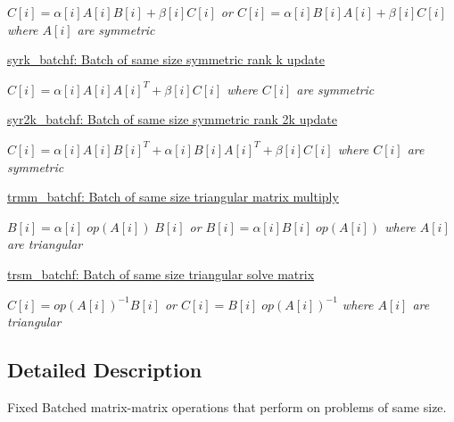 \begin{DoxyCompactItemize}
\begin{DoxyCompactList}\small\item\em $ C[i] = \alpha[i] A[i] B[i] + \beta[i] C[i] $ or $ C[i] = \alpha[i] B[i] A[i] + \beta[i] C[i] $ where $ A[i] $ are symmetric \end{DoxyCompactList}\item 
\hyperlink{group__syrk__batchf}{syrk\+\_\+batchf\+: Batch of same size symmetric rank k update}
\begin{DoxyCompactList}\small\item\em $ C[i] = \alpha[i] A[i] A[i]^T + \beta[i] C[i] $ where $ C[i] $ are symmetric \end{DoxyCompactList}\item 
\hyperlink{group__syr2k__batchf}{syr2k\+\_\+batchf\+: Batch of same size symmetric rank 2k update}
\begin{DoxyCompactList}\small\item\em $ C[i] = \alpha[i] A[i] B[i]^T + \alpha[i] B[i] A[i]^T + \beta[i] C[i] $ where $ C[i] $ are symmetric \end{DoxyCompactList}\item 
\hyperlink{group__trmm__batchf}{trmm\+\_\+batchf\+: Batch of same size triangular matrix multiply}
\begin{DoxyCompactList}\small\item\em $ B[i] = \alpha[i] \;op(A[i])\; B[i] $ or $ B[i] = \alpha[i] B[i] \;op(A[i]) $ where $ A[i] $ are triangular \end{DoxyCompactList}\item 
\hyperlink{group__trsm__batchf}{trsm\+\_\+batchf\+: Batch of same size triangular solve matrix}
\begin{DoxyCompactList}\small\item\em $ C[i] = op(A[i])^{-1} B[i] $ or $ C[i] = B[i] \;op(A[i])^{-1} $ where $ A[i] $ are triangular \end{DoxyCompactList}\end{DoxyCompactItemize}


\subsection{Detailed Description}
Fixed Batched matrix-\/matrix operations that perform on problems of same size. 

